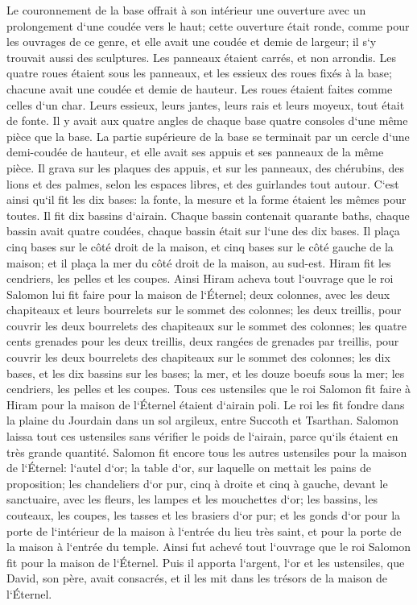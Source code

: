 \verse Le couronnement de la base offrait à son intérieur une ouverture avec un prolongement d`une coudée vers le haut; cette ouverture était ronde, comme pour les ouvrages de ce genre, et elle avait une coudée et demie de largeur; il s`y trouvait aussi des sculptures. Les panneaux étaient carrés, et non arrondis. 
\verse Les quatre roues étaient sous les panneaux, et les essieux des roues fixés à la base; chacune avait une coudée et demie de hauteur. 
\verse Les roues étaient faites comme celles d`un char. Leurs essieux, leurs jantes, leurs rais et leurs moyeux, tout était de fonte. 
\verse Il y avait aux quatre angles de chaque base quatre consoles d`une même pièce que la base. 
\verse La partie supérieure de la base se terminait par un cercle d`une demi-coudée de hauteur, et elle avait ses appuis et ses panneaux de la même pièce. 
\verse Il grava sur les plaques des appuis, et sur les panneaux, des chérubins, des lions et des palmes, selon les espaces libres, et des guirlandes tout autour. 
\verse C`est ainsi qu`il fit les dix bases: la fonte, la mesure et la forme étaient les mêmes pour toutes. 
\verse Il fit dix bassins d`airain. Chaque bassin contenait quarante baths, chaque bassin avait quatre coudées, chaque bassin était sur l`une des dix bases. 
\verse Il plaça cinq bases sur le côté droit de la maison, et cinq bases sur le côté gauche de la maison; et il plaça la mer du côté droit de la maison, au sud-est. 
\verse Hiram fit les cendriers, les pelles et les coupes. Ainsi Hiram acheva tout l`ouvrage que le roi Salomon lui fit faire pour la maison de l`Éternel; 
\verse deux colonnes, avec les deux chapiteaux et leurs bourrelets sur le sommet des colonnes; les deux treillis, pour couvrir les deux bourrelets des chapiteaux sur le sommet des colonnes; 
\verse les quatre cents grenades pour les deux treillis, deux rangées de grenades par treillis, pour couvrir les deux bourrelets des chapiteaux sur le sommet des colonnes; 
\verse les dix bases, et les dix bassins sur les bases; 
\verse la mer, et les douze boeufs sous la mer; 
\verse les cendriers, les pelles et les coupes. Tous ces ustensiles que le roi Salomon fit faire à Hiram pour la maison de l`Éternel étaient d`airain poli. 
\verse Le roi les fit fondre dans la plaine du Jourdain dans un sol argileux, entre Succoth et Tsarthan. 
\verse Salomon laissa tout ces ustensiles sans vérifier le poids de l`airain, parce qu`ils étaient en très grande quantité. 
\verse Salomon fit encore tous les autres ustensiles pour la maison de l`Éternel: l`autel d`or; la table d`or, sur laquelle on mettait les pains de proposition; 
\verse les chandeliers d`or pur, cinq à droite et cinq à gauche, devant le sanctuaire, avec les fleurs, les lampes et les mouchettes d`or; 
\verse les bassins, les couteaux, les coupes, les tasses et les brasiers d`or pur; et les gonds d`or pour la porte de l`intérieur de la maison à l`entrée du lieu très saint, et pour la porte de la maison à l`entrée du temple. 
\verse Ainsi fut achevé tout l`ouvrage que le roi Salomon fit pour la maison de l`Éternel. Puis il apporta l`argent, l`or et les ustensiles, que David, son père, avait consacrés, et il les mit dans les trésors de la maison de l`Éternel. 

